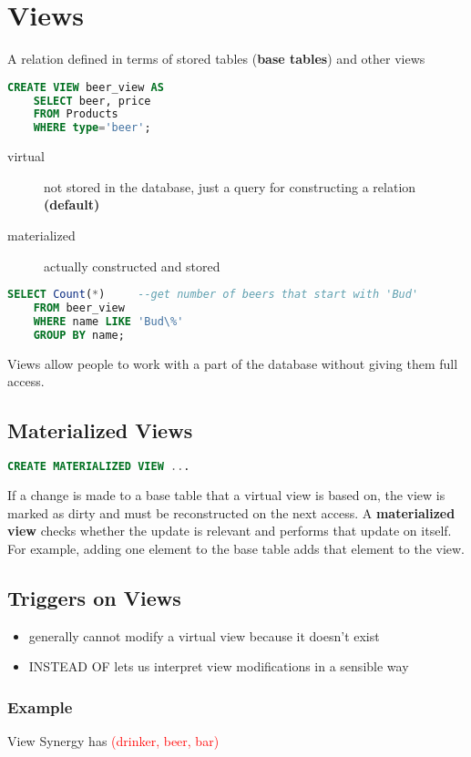 \documentclass[12pt]{article}
\begin{document}
\section{Views}
A relation defined in terms of stored tables (\textbf{base tables}) and other
views
\begin{lstlisting}[language=sql, caption=virtual view creation]
  CREATE VIEW beer_view AS
    SELECT beer, price
    FROM Products
    WHERE type='beer';
\end{lstlisting}
\begin{description}
  \item[virtual] not stored in the database, just a query for constructing a
    relation \textbf{(default)}
  \item[materialized] actually constructed and stored
\end{description}
\begin{lstlisting}[language=sql, caption=virtual view usage]
  SELECT Count(*)     --get number of beers that start with 'Bud'
    FROM beer_view
    WHERE name LIKE 'Bud\%'
    GROUP BY name;
\end{lstlisting}
Views allow people to work with a part of the database without giving them full
access.

\subsection{Materialized Views}
\begin{lstlisting}[language=sql, caption=materialized view]
  CREATE MATERIALIZED VIEW ...
\end{lstlisting}
If a change is made to a base table that a virtual view is based on, the view is
marked as dirty and must be reconstructed on the next access.
A \textbf{materialized view} checks whether the update is relevant and performs
that update on itself. For example, adding one element to the base table adds
that element to the view.
\subsection{Triggers on Views}
\begin{itemize}
  \item generally cannot modify a virtual view because it doesn't exist
  \item INSTEAD OF lets us interpret view modifications in a sensible way
\end{itemize}
\subsubsection{Example}
View Synergy has \textcolor{red}{(drinker, beer, bar)}
\end{document}
